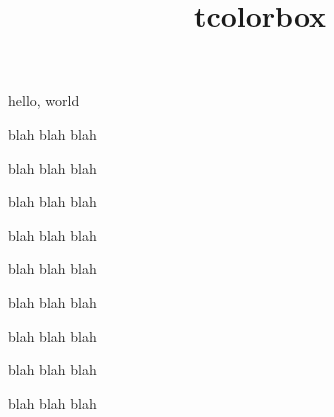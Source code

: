 \documentclass{amsart}
\title{tcolorbox}
\begin{document}
\maketitle

hello, world

\newpage

\begin{tcolorbox}
blah blah blah

blah blah blah

blah blah blah
\end{tcolorbox}

\newpage

\begin{tcolorbox}[colframe=black]
blah blah blah

blah blah blah

blah blah blah
\end{tcolorbox}

\newpage

\begin{tcolorbox}[colframe=blue, title = This is my title]
blah blah blah

blah blah blah

blah blah blah
\end{tcolorbox}
\end{document}
